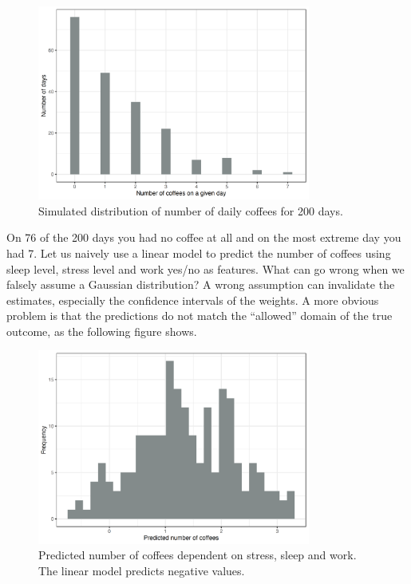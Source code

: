 \documentclass[
  10pt,
]{scrbook}
\begin{document}
\begin{figure}

{\centering \includegraphics[width=0.8\textwidth]{images/poisson-data-1} 

}

\caption{Simulated distribution of number of daily coffees for 200 days.}\label{fig:poisson-data}
\end{figure}

On 76 of the 200 days you had no coffee at all and on the most extreme day you had 7.
Let us naively use a linear model to predict the number of coffees using sleep level, stress level and work yes/no as features.
What can go wrong when we falsely assume a Gaussian distribution?
A wrong assumption can invalidate the estimates, especially the confidence intervals of the weights.
A more obvious problem is that the predictions do not match the ``allowed'' domain of the true outcome, as the following figure shows.

\begin{figure}

{\centering \includegraphics[width=0.8\textwidth]{images/failing-linear-model-1} 

}

\caption{Predicted number of coffees dependent on stress, sleep and work. The linear model predicts negative values.}\label{fig:failing-linear-model}
\end{figure}
\end{document}
